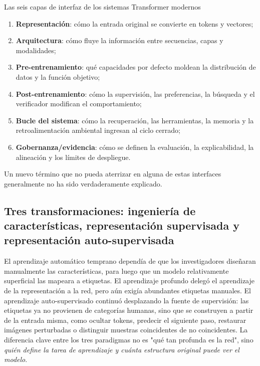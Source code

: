 \begin{importantbox}{Las seis capas de interfaz de los sistemas Transformer modernos}
\begin{enumerate}
  \item \textbf{Representación}: cómo la entrada original se convierte en tokens y vectores;
  \item \textbf{Arquitectura}: cómo fluye la información entre secuencias, capas y modalidades;
  \item \textbf{Pre-entrenamiento}: qué capacidades por defecto moldean la distribución de datos y la función objetivo;
  \item \textbf{Post-entrenamiento}: cómo la supervisión, las preferencias, la búsqueda y el verificador modifican el comportamiento;
  \item \textbf{Bucle del sistema}: cómo la recuperación, las herramientas, la memoria y la retroalimentación ambiental ingresan al ciclo cerrado;
  \item \textbf{Gobernanza/evidencia}: cómo se definen la evaluación, la explicabilidad, la alineación y los límites de despliegue.
\end{enumerate}
Un nuevo término que no pueda aterrizar en alguna de estas interfaces generalmente no ha sido verdaderamente explicado.
\end{importantbox}

\subsection{Tres transformaciones: ingeniería de características, representación supervisada y representación auto-supervisada}

El aprendizaje automático temprano dependía de que los investigadores diseñaran manualmente las características, para luego que un modelo relativamente superficial las mapeara a etiquetas. El aprendizaje profundo delegó el aprendizaje de la representación a la red, pero aún exigía abundantes etiquetas manuales. El aprendizaje auto-supervisado continuó desplazando la fuente de supervisión: las etiquetas ya no provienen de categorías humanas, sino que se construyen a partir de la entrada misma, como ocultar tokens, predecir el siguiente paso, restaurar imágenes perturbadas o distinguir muestras coincidentes de no coincidentes. La diferencia clave entre los tres paradigmas no es "qué tan profunda es la red", sino \emph{quién define la tarea de aprendizaje y cuánta estructura original puede ver el modelo}.

